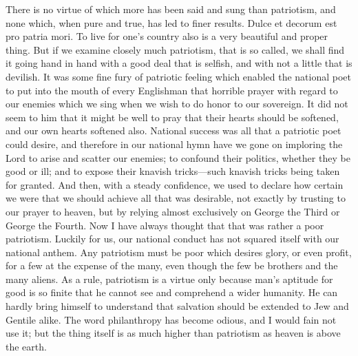 There is no virtue of which more has been said and sung than
patriotism, and none which, when pure and true, has led to finer
results.  Dulce et decorum est pro patria mori.  To live for one's
country also is a very beautiful and proper thing.  But if we
examine closely much patriotism, that is so called, we shall find
it going hand in hand with a good deal that is selfish, and with
not a little that is devilish.  It was some fine fury of patriotic
feeling which enabled the national poet to put into the mouth of
every Englishman that horrible prayer with regard to our enemies
which we sing when we wish to do honor to our sovereign.  It did
not seem to him that it might be well to pray that their hearts
should be softened, and our own hearts softened also.  National
success was all that a patriotic poet could desire, and therefore
in our national hymn have we gone on imploring the Lord to arise
and scatter our enemies; to confound their politics, whether they
be good or ill; and to expose their knavish tricks---such knavish
tricks being taken for granted.  And then, with a steady
confidence, we used to declare how certain we were that we should
achieve all that was desirable, not exactly by trusting to our
prayer to heaven, but by relying almost exclusively on George the
Third or George the Fourth.  Now I have always thought that that
was rather a poor patriotism.  Luckily for us, our national conduct
has not squared itself with our national anthem.  Any patriotism
must be poor which desires glory, or even profit, for a few at the
expense of the many, even though the few be brothers and the many
aliens.  As a rule, patriotism is a virtue only because man's
aptitude for good is so finite that he cannot see and comprehend a
wider humanity.  He can hardly bring himself to understand that
salvation should be extended to Jew and Gentile alike.  The word
philanthropy has become odious, and I would fain not use it; but
the thing itself is as much higher than patriotism as heaven is
above the earth.

